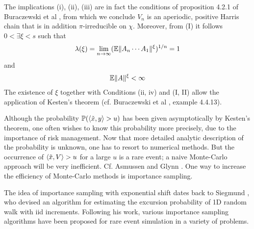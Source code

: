 The implications (i), (ii), (iii) are in fact the conditions of
proposition 4.2.1 of Buraczewski et al
\cite{buraczewski:damek:mikosch:2016}, from which we conclude $V_n$ is
an aperiodic, positive Harris chain that is in addition
$\pi$-irreducible on $\chi$.
Moreover, from (I) it follows $0 < \exists \xi < s$ such that
\begin{equation}
  \label{eq:hyt}
  \lambda(\xi) = \lim_{n \to \infty} (\mathbb{E} \|A_n \cdots A_1\|^\xi)^{1/n} = 1
\end{equation}
and
\begin{equation}
  \label{eq:jui}
  \mathbb{E} \|A\|^\xi < \infty
\end{equation}
The existence of $\xi$ together with Conditions (ii, iv) and (I, II)
allow the application of Kesten's theorem (cf. Buraczewski et al
\cite{buraczewski:damek:mikosch:2016}, example 4.4.13).

Although the probability $\mathbb{P}(\langle\tilde x, y\rangle > u)$ has been given
asymptotically by Kesten's theorem, one often wishes to know
this probability more precisely, due to the importance of risk
management. Now that more detailed analytic description of the
probability is unknown, one has to resort to numerical methods. But
the occurrence of $\langle\tilde x, V\rangle > u$ for a large $u$ is a rare event; a
naive Monte-Carlo approach will be very inefficient. Cf. Asmussen and
Glynn \cite{opac-b1123521}.
One way to increase the efficiency of Monte-Carlo methods is
importance sampling.

The idea of importance sampling with exponential shift dates back
to Siegmund \cite{siegmund:1976}, who devised an algorithm for
estimating the excursion probability of 1D random walk with iid
increments. Following his work, various importance sampling algorithms
have been proposed for rare event simulation in a variety of problems.

